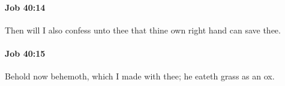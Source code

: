 		\paragraph{Job 40:14} %
			\label{JOB-40-14}

			Then will I also confess unto thee that thine own right hand can save thee.


		\paragraph{Job 40:15} %
			\label{JOB-40-15}

			Behold now behemoth, which I made with thee; he eateth grass as an ox.


